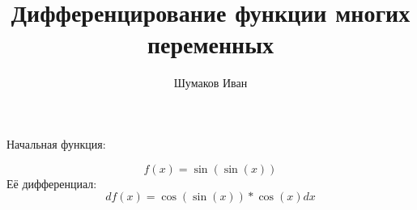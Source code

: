 \documentclass[14pt, a5paper]{article}
\title{Дифференцирование функции многих переменных}
\author{Шумаков Иван}
\begin{document}
\maketitle

Начальная функция:

\begin{displaymath}
f(x) = \sin(\sin(x))
\end{displaymath}
Её дифференциал:
\begin{displaymath}
df(x) = \cos(\sin(x))*\cos(x)dx
\end{displaymath}
\end{document}
